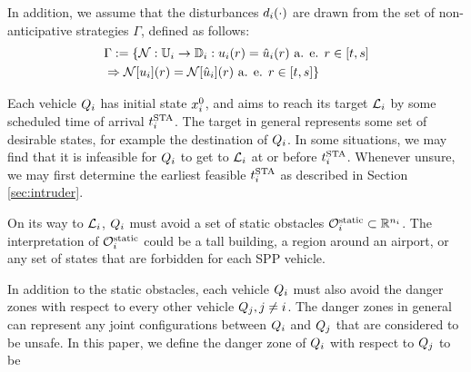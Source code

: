 
In addition, we assume that the disturbances $d_i(\cdot)$ are drawn from the set of non-anticipative strategies \cite{Mitchell05} $\Gamma$, defined as follows:
\begin{equation}
\begin{aligned}
& \Gamma := \{\mathcal{N}: \mathbb{U}_i \rightarrow \mathbb{D}_i:  u_i(r) = \hat{u}_i(r) \text{ a. e. } r\in[t,s] \\
& \Rightarrow \mathcal{N}[u_i](r) = \mathcal{N}[\hat{u}_i](r) \text{ a. e. } r\in[t,s]\}
\end{aligned}
\end{equation}

Each vehicle $Q_i$ has initial state $x^0_i$, and aims to reach its target $\mathcal{L}_i$ by some scheduled time of arrival $t^\text{STA}_i$. The target in general represents some set of desirable states, for example the destination of $Q_i$. %
In some situations, we may find that it is infeasible for $Q_i$ to get to $\mathcal{L}_i$ at or before $t^\text{STA}_i$. Whenever unsure, we may first determine the earliest feasible $t^\text{STA}_i$ as described in Section \ref{sec:intruder}. 

On its way to $\mathcal{L}_i$, $Q_i$ must avoid a set of static obstacles $\mathcal{O}^\text{static}_i \subset \mathbb{R}^{n_i}$. The interpretation of $\mathcal{O}^\text{static}_i$ could be a tall building, a region around an airport, or any set of states that are forbidden for each SPP vehicle.

In addition to the static obstacles, each vehicle $Q_i$ must also avoid the danger zones with respect to every other vehicle $Q_j, j\neq i$. The danger zones in general can represent any joint configurations between $Q_i$ and $Q_j$ that are considered to be unsafe. In this paper, we define the danger zone of $Q_i$ with respect to $Q_j$ to be

